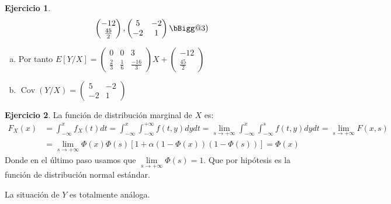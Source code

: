 \documentclass[12pt,spanish]{article}
\makeatletter
\newcommand{\vast}{\bBigg@{3}}
\theoremstyle{definition}
\newtheorem{exercise}{Ejercicio}
\makeatother
\begin{document}
\begin{exercise}
\[\begin{pmatrix}
      -12 \\ \frac{45}{2}
    \end{pmatrix},
    \begin{pmatrix}
      5 & -2 \\
      -2 & 1
    \end{pmatrix}\vast)\]
  \begin{enumerate}[a)]
  \item Por tanto $E[Y/X]=\begin{pmatrix}
      0 & 0 & 3 \\
      \frac{2}{3} & \frac{1}{6} & \frac{-16}{3}
    \end{pmatrix}X+
    \begin{pmatrix}
      -12 \\ \frac{45}{2}
    \end{pmatrix}$
  \item $\operatorname{Cov}(Y/X)=\begin{pmatrix}
      5 & -2 \\
      -2 & 1
    \end{pmatrix}$
  \end{enumerate}
\end{exercise}

\begin{exercise} %
  La función de distribución marginal de $X$ es:
  \begin{align*}
    F_X(x)&=\int_{-\infty}^xf_X(t)dt=\int_{-\infty}^x\int_{-\infty}^{+\infty}f(t,y)dydt=\lim_{s\to+\infty}\int_{-\infty}^x\int_{-\infty}^sf(t,y)dydt=\lim_{s\to+\infty}F(x,s) \\
          &=\lim_{s\to+\infty}\Phi(x)\Phi(s)[1+\alpha(1-\Phi(x))(1-\Phi(s))] = \Phi(x)
  \end{align*}
  Donde en el último paso usamos que
  $\lim\limits_{s\to+\infty}\Phi(s)=1$.
  Que por hipótesis es la función de distribución normal estándar.

  La situación de $Y$ es totalmente análoga.
\end{exercise}
\end{document}

